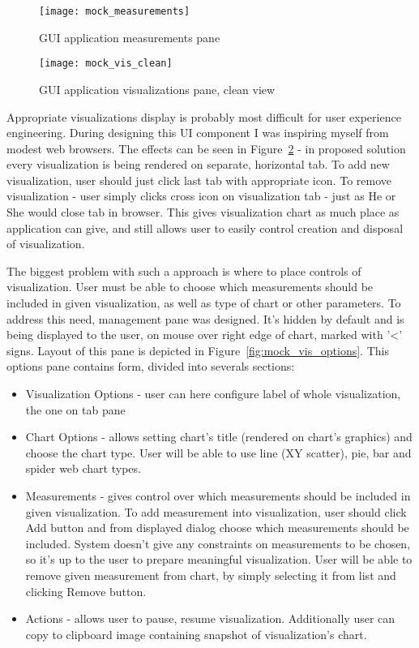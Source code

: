 \begin{figure}[ht]
  \centering
  \texttt{[image: mock\_measurements]}
  \caption{GUI application measurements pane}
  \label{fig:mock_measurements}
\end{figure}



\begin{figure}[ht]
  \centering
  \texttt{[image: mock\_vis\_clean]}
  \caption{GUI application visualizations pane, clean view}
  \label{fig:mock_vis_clean}
\end{figure}

Appropriate visualizations display is probably most difficult for user experience engineering. During designing this UI
component I was inspiring myself from modest web browsers. The effects can be seen in Figure~\ref{fig:mock_vis_clean} -
in proposed solution every visualization is being rendered on separate, horizontal tab. To add new visualization, user
should just click last tab with appropriate icon. To remove visualization - user simply clicks cross icon on
visualization tab - just as He or She would close tab in browser. This gives visualization chart as much place as
application can give, and still allows user to easily control creation and disposal of visualization.

The biggest problem with such a approach is where to place controls of visualization. User must be able to choose which
measurements should be included in given visualization, as well as type of chart or other parameters. To address this
need, management pane was designed. It's hidden by default and is being displayed to the user, on mouse over right
edge of chart, marked with '<' signs. Layout of this pane is depicted in Figure~\ref{fig:mock_vis_options}. This
options pane contains form, divided into severals sections:

\begin{itemize}
 \item Visualization Options - user can here configure label of whole visualization, the one on tab pane
 \item Chart Options - allows setting chart's title (rendered on chart's graphics) and choose the chart type. User will
be able to use line (XY scatter), pie, bar and  spider web chart types.
 \item Measurements - gives control over which measurements should be included in given visualization. To add
measurement into visualization, user should click Add button and from displayed dialog choose which measurements should
be included. System doesn't give any constraints on measurements to be chosen, so it's up to the user to prepare
meaningful visualization. User will be able to remove given measurement from chart, by simply selecting it from list
and clicking Remove button.
 \item Actions - allows user to pause, resume visualization. Additionally user can copy to clipboard image containing
snapshot of visualization's chart.
\end{itemize}


